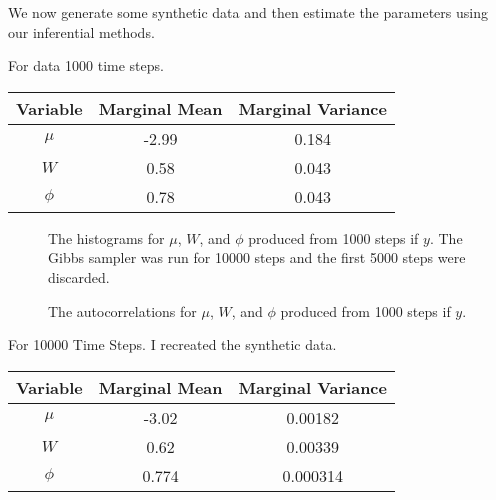 \documentclass{article}
\begin{document}
We now generate some synthetic data and then estimate the parameters using our inferential methods.

For data 1000 time steps.

\begin{center}
\begin{tabular}{c | c | c}
Variable & Marginal Mean & Marginal Variance \\
\hline
$\mu$ & -2.99 & 0.184 \\
$W$ & 0.58 & 0.043 \\
$\phi$ & 0.78 & 0.043 \\
\end{tabular}
\end{center}

\begin{figure}[!h]
\begin{center}
\end{center}
\label{DLM4:histograms}
\caption{The histograms for $\mu$, $W$, and $\phi$ produced from  1000 steps if $y$.  The Gibbs sampler was run for 10000 steps and the first 5000 steps were discarded.}
\end{figure}

\begin{figure}[!h]
\begin{center}
\end{center}
\label{DLM4:histograms}
\caption{The autocorrelations for $\mu$, $W$, and $\phi$ produced from  1000 steps if $y$.}
\end{figure}

For 10000 Time Steps.  I recreated the synthetic data.

\begin{center}
\begin{tabular}{c | c | c}
Variable & Marginal Mean & Marginal Variance \\
\hline
$\mu$ & -3.02 & 0.00182 \\
$W$ & 0.62 & 0.00339 \\
$\phi$ & 0.774 & 0.000314 \\
\end{tabular}
\end{center}
\end{document}
